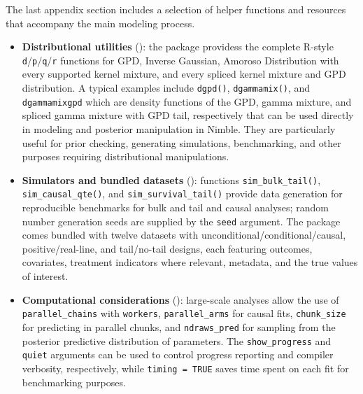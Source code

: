 \documentclass[article]{jss}\usepackage[]{graphicx}\usepackage[]{xcolor}
\DeclareRobustCommand{\pkg}[1]{\textsf{#1}}
\DeclareRobustCommand{\code}[1]{\nolinkurl{#1}}
\begin{document}
The last appendix section includes a selection of helper functions and
resources that accompany the main modeling process.

\begin{itemize}
\item \textbf{Distributional utilities} (\label{subsec:app-distutils}): the package providess the complete \textsf{R}-style \code{d}/\code{p}/\code{q}/\code{r} functions for GPD, Inverse Gaussian, Amoroso Distribution with  every supported kernel mixture, and every spliced kernel mixture and GPD distribution. A typical examples include \code{dgpd()}, \code{dgammamix()}, and \code{dgammamixgpd} which are density functions of
the GPD, gamma mixture, and spliced gamma mixture with GPD tail, respectively that can be used directly in modeling and posterior manipulation in \pkg{Nimble}. They are particularly useful for prior checking, generating simulations, benchmarking, and other purposes requiring distributional manipulations.

\item \textbf{Simulators and bundled datasets} (\label{subsec:app-simulation}): functions \code{sim\_bulk\_tail()}, \code{sim\_causal\_qte()}, and \code{sim\_survival\_tail()} provide data generation for reproducible benchmarks for bulk and tail and causal analyses; random number generation seeds are supplied by the \code{seed} argument. The package comes bundled with twelve datasets with unconditional/conditional/causal, positive/real-line, and tail/no-tail designs, each featuring outcomes, covariates, treatment indicators where relevant, metadata, and the true values of interest.
\item \textbf{Computational considerations} (\label{subsec:app-computation}): large-scale analyses allow the use of \code{parallel\_chains} with \code{workers}, \code{parallel\_arms} for causal fits, \code{chunk\_size} for predicting in parallel chunks, and \code{ndraws\_pred} for sampling from the posterior predictive distribution of parameters. The \code{show\_progress} and \code{quiet} arguments can be used to control progress reporting and compiler verbosity, respectively, while \code{timing = TRUE} saves time spent on each fit for benchmarking purposes.
\end{itemize}
\end{document}
